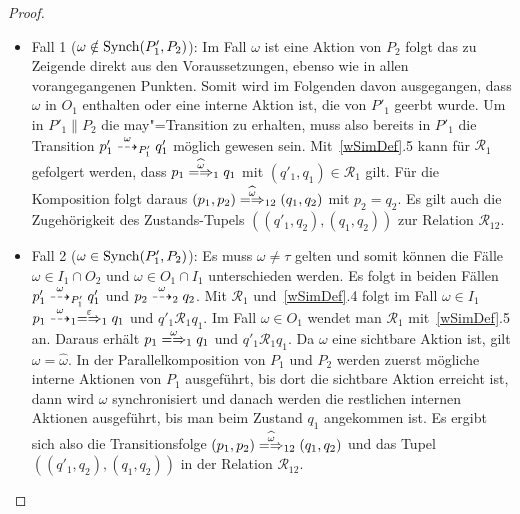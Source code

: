 \begin{proof}
\begin{enumerate}
\begin{itemize}
        \item Fall 1 ($\omega\notin\mathrm{Synch} (P'_1,P_2)$): Im Fall $\omega$ ist
          eine Aktion von $P_2$ folgt das zu Zeigende direkt aus den
          Voraussetzungen, ebenso wie in allen vorangegangenen Punkten. Somit
          wird im Folgenden davon ausgegangen, dass $\omega$ in $O_1$ enthalten
          oder eine interne Aktion ist, die von $P'_1$ geerbt wurde. Um in
          $P'_1\|P_2$ die may"=Transition zu erhalten, muss also bereits in
          $P'_1$ die Transition $p'_1 \may[\omega]_{P'_1} q'_1$ möglich gewesen
          sein. Mit~\ref{wSimDef}.5 kann für $\mathcal{R}_1$ gefolgert werden,
          dass $p_1 \weakmay[\widehat{\omega}]_1 q_1$ mit $(q'_1,q_1) \in
          \mathcal{R}_1$ gilt. Für die Komposition folgt daraus $(p_1,p_2)
          \weakmay[\widehat{\omega}]_{12} (q_1,q_2)$ mit $p_2=q_2$. Es gilt auch
          die Zugehörigkeit des Zustands-Tupels $((q'_1,q_2),(q_1,q_2))$ zur
          Relation $\mathcal{R}_{12}$.
        \item Fall 2 ($\omega\in\mathrm{Synch} (P'_1,P_2)$): Es muss $\omega\neq\tau$
          gelten und somit können die Fälle $\omega\in I_1\cap O_2$ und
          $\omega\in O_1\cap I_1$ unterschieden werden. Es folgt in beiden
          Fällen $p'_1\may[\omega]_{P'_1} q'_1$ und $p_2 \may[\omega]_2
          q_2$. Mit $\mathcal{R}_1$ und~\ref{wSimDef}.4 folgt im Fall
          $\omega\in I_1$ $p_1\may[\omega]_1 \weakmay[\varepsilon]_1 q_1$ und
          $q'_1 \mathcal{R}_1 q_1$. Im Fall $\omega\in O_1$ wendet man
          $\mathcal{R}_1$ mit~\ref{wSimDef}.5 an. Daraus erhält $p_1
          \weakmay[\omega]_1 q_1$ und $q'_1\mathcal{R}_1 q_1$. Da $\omega$
          eine sichtbare Aktion ist, gilt $\omega =\widehat{\omega}$. In der
          Parallelkomposition von $P_1$ und $P_2$ werden zuerst mögliche
          interne Aktionen von $P_1$ ausgeführt, bis dort die sichtbare Aktion
          erreicht ist, dann wird $\omega$ synchronisiert und danach werden die
          restlichen internen Aktionen ausgeführt, bis man beim Zustand
          $q_1$ angekommen ist. Es ergibt sich also die Transitionsfolge
          $(p_1,p_2) \weakmay[\widehat{\omega}]_{12} (q_1,q_2)$ und das Tupel
          $((q'_1,q_2),(q_1,q_2))$ in der Relation $\mathcal{R}_{12}$.
      \end{itemize}
  \end{enumerate}
\end{proof}

